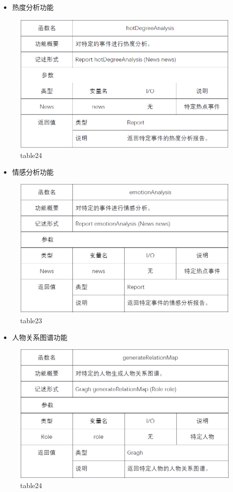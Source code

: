 \begin{itemize}
	\item 热度分析功能
\end{itemize}
\begin{figure}[!htbp]
	\centering
	\includegraphics[scale=0.7]{image/b24.png} %
	\caption{table24} %
\end{figure}
\begin{itemize}
	\item 情感分析功能
\end{itemize}
\begin{figure}[!htbp]
	\centering
	\includegraphics[scale=0.7]{image/b25.png} %
	\caption{table23} %
\end{figure}
\begin{itemize}
	\item 人物关系图谱功能
\end{itemize}
\begin{figure}[!htbp]
	\centering
	\includegraphics[scale=0.7]{image/b26.png} %
	\caption{table24} %
\end{figure}
